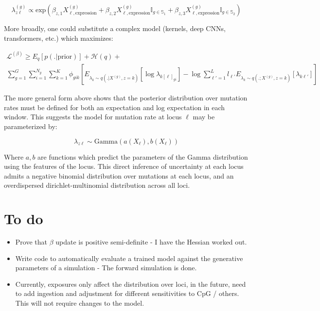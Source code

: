 \documentclass{article}
\newcommand{\Lagr}{\mathcal{L}}
\begin{document}
\begin{equation}
\lambda^{(g)}_{z\ell} \propto \textrm{exp}\left( \beta_{z,1} X^{(g)}_{\ell,\textrm{expression}} + \beta_{z,2} X^{(g)}_{\ell,\textrm{expression}} \mathbb{I}_{g\in\mathbb{S}_1} + \beta_{z,3} X^{(g)}_{\ell,\textrm{expression}} \mathbb{I}_{g\in\mathbb{S}_2} \right)
\end{equation}

More broadly, one could substitute a complex model (kernels, deep CNNs, transformers, etc.) which maximizes:

\begin{equation}
\begin{split}
\Lagr^{(\beta)} \geq E_q [ p(. | \textrm{prior}) ] + \mathcal{H}(q) + \\
	\sum_{g=1}^G \sum_{i=1}^{N_g} \sum_{k=1}^K  \phi_{gik} \left[ E_{\lambda_k \sim q(.|X^{(g)}, z=k)} [ \log \lambda_{k[\ell]_{gi}}] - \log{\sum_{\ell'=1}^L l_{\ell'}  E_{\lambda_k \sim q(.;X^{(g)}, z=k)}[\lambda_{k\ell'}]} \right]
\end{split}
\end{equation}

The more general form above shows that the posterior distribution over mutation rates must be defined for both an expectation and log expectation in each window. This suggests the model for mutation rate at locus $\ell$ may be parameterized by:

\begin{equation}
\lambda_{z\ell} \sim \mathrm{Gamma}(a(X_\ell), b(X_\ell))
\end{equation}

Where $a, b$ are functions which predict the parameters of the Gamma distribution using the features of the locus. This direct inference of uncertainty at each locus admits a negative binomial distribution over mutations at each locus, and an overdispersed dirichlet-multinomial distribution across all loci.

\section{To do}

\begin{itemize}
  \item Prove that $\beta$ update is positive semi-definite - I have the Hessian worked out.
  \item Write code to automatically evaluate a trained model against the generative parameters of a simulation - The forward simulation is done.
  \item Currently, exposures only affect the distribution over loci, in the future, need to add ingestion and adjustment for 
  	different sensitivities to CpG / others. This will not require changes to the model.
\end{itemize}
\end{document}

